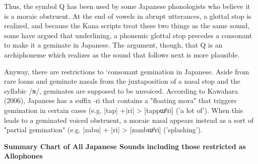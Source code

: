 \par{  Thus, the symbol Q has been used by some Japanese phonologists who believe it is a moraic obstruent. At the end of vowels in abrupt utterances, a glottal stop is realized, and because the Kana scripts treat these two things as the same sound, some have argued that underlining, a phonemic glottal stop precedes a consonant to make it a geminate in Japanese. The argument, though, that Q is an archiphoneme which realizes as the sound that follows next is more plausible. }

\par{  Anyway, there are restrictions to ‘consonant gemination in Japanese\textquotesingle . Aside from rare loans and geminate nasals from the juxtaposition of a nasal stop and the syllabic \slash ɴ\slash , geminates are supposed to be unvoiced. According to Kawahara (2006), Japanese has a suffix -ɾi that contains a "floating mora" that triggers gemination in certain cases (e.g. |tap| +|ri| > [tappɯᵝɾi] ('a lot of'). When this leads to a geminated voiced obstruent, a moraic nasal appears instead as a sort of "partial gemination" (e.g. |zabu| + |ri| > [zambɯᵝɾi] ('splashing'). }

\begin{center}
\textbf{Summary Chart of All Japanese Sounds including those restricted as Allophones }
\end{center}

